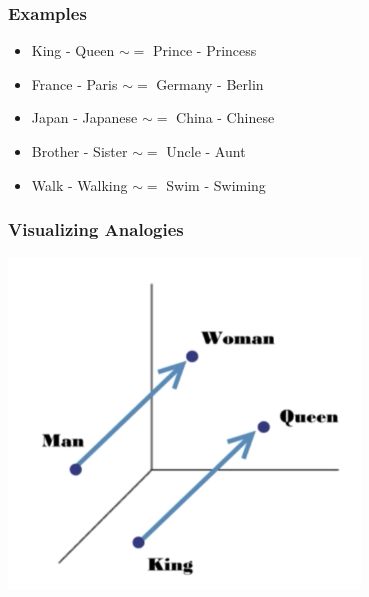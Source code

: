 \documentclass[compress, aspectratio=54]{beamer}
\begin{document}
\begin{frame}
\frametitle{Examples}
\begin{itemize}
\item King - Queen $\sim =$ Prince - Princess
\item France - Paris $\sim =$  Germany - Berlin
\item Japan - Japanese $\sim =$  China - Chinese
\item Brother - Sister $\sim = $ Uncle - Aunt
\item Walk - Walking $\sim =$  Swim - Swiming
\end{itemize}

\end{frame}

\begin{frame}
\frametitle{Visualizing Analogies}

\begin{center}
    \includegraphics[width=0.7\textwidth]{Figures/visualizing-analogies}
\end{center}
\end{frame}
\end{document}
